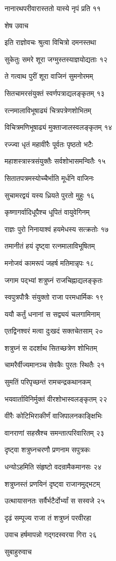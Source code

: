 नानारथपरीवारास्ततो यास्ये नृपं प्रति ११

शेष उवाच

इति राज्ञोवचः श्रुत्वा विचित्रो दमनस्तथा

सुकेतुः समरे शूरा जग्मुस्तस्याज्ञयोद्यताः १२

ते गत्वाथ पुरीं शूरा वाजिनं सुमनोरमम्

सितचामरसंयुक्तं स्वर्णपत्राद्यलङ्कृतम् १३

रत्नमालाविभूषाढ्यं चित्रपत्रेणशोभितम्

विचित्रमणिभूषाढ्यं मुक्ताजालस्वलङ्कृतम् १४

रज्ज्वा धृतं महावीरैः पूर्वतः पृष्ठतो भटैः

महाशस्त्रास्त्रसंयुक्तैः सर्वशोभासमन्वितैः १५

सितातपत्रमस्योच्चैर्भाति मूर्धनि वाजिनः

सुचामरद्वयं यस्य ध्रियते पुरतो मुहुः १६

कृष्णागर्वादिधूपैश्च धूपितं वायुवेगिनम्

राज्ञः पुरो निनायाश्वं हयमेधस्य सत्क्रतोः १७

तमानीतं हयं दृष्ट्वा रत्नमालाविभूषितम्

मनोजवं कामरूपं जहर्ष मतिमान्नृपः १८

जगाम पद्भ्यां शत्रुघ्नं राजचिह्नाद्यलङ्कृतः

स्वपुत्रपौत्रैः संयुक्तो राजा परमधार्मिकः १९

ययौ कर्तुं धनानां स सद्व्ययं चलगामिनाम्

एतद्विनश्वरं मत्वा दुःखदं सक्तचेतसाम् २०

शत्रुघ्नं स ददर्शाथ सितच्छत्रेण शोभितम्

चामरैर्वीज्यमानञ्च सेवकैः पुरतः स्थितैः २१

सुमतिं परिपृच्छन्तं रामचन्द्रकथानकम्

भयवार्ताविनिर्मुक्तं वीरशोभास्वलङ्कृतम् २२

वीरैः कोटिभिराकीर्णं वाजिपालनकाङ्क्षिभिः

वानराणां सहस्रैश्च समन्तात्परिवारितम् २३

दृष्ट्वा शत्रुघ्नचरणौ प्रणनाम सपुत्रकः

धन्योऽहमिति संहृष्टो वदन्रामैकमानसः २४

शत्रुघ्नस्तं प्रणयिनं दृष्ट्वा राजानमुद्भटम्

उत्थायासनतः सर्वैर्भटैर्दोर्भ्यां स सस्वजे २५

दृढं सम्पूज्य राजा तं शत्रुघ्नं परवीरहा

उवाच हर्षमापन्नो गद्गदस्वरया गिरा २६

सुबाहुरुवाच

